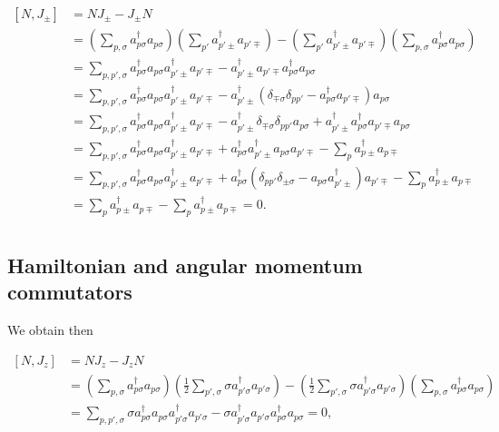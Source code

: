 \documentclass[11pt]{article}
\begin{document}
    \[
\begin{align*}
[N,J_\pm] &= N J_\pm - J_\pm N \\
&= \left( \sum_{p,\sigma} a_{p\sigma}^\dagger a_{p\sigma} \right)
\left( \sum_{p'} a_{p'\pm}^\dagger a_{p'\mp} \right) -
\left( \sum_{p'} a_{p'\pm}^\dagger a_{p'\mp} \right)
\left( \sum_{p,\sigma} a_{p\sigma}^\dagger a_{p\sigma} \right) \\
&= \sum_{p,p',\sigma}
a_{p\sigma}^\dagger a_{p\sigma} a_{p'\pm}^\dagger a_{p'\mp} -
a_{p'\pm}^\dagger a_{p'\mp} a_{p\sigma}^\dagger a_{p\sigma} \\
&= \sum_{p,p',\sigma}
a_{p\sigma}^\dagger a_{p\sigma} a_{p'\pm}^\dagger a_{p'\mp} -
a_{p'\pm}^\dagger \left( \delta_{\mp \sigma} \delta_{pp'} - a_{p\sigma}^\dagger a_{p'\mp} \right) a_{p\sigma} \\
&= \sum_{p,p',\sigma}
a_{p\sigma}^\dagger a_{p\sigma} a_{p'\pm}^\dagger a_{p'\mp} -
a_{p'\pm}^\dagger \delta_{\mp \sigma} \delta_{pp'} a_{p\sigma} +
a_{p'\pm}^\dagger a_{p\sigma}^\dagger a_{p'\mp} a_{p\sigma} \\
&= \sum_{p,p',\sigma}
a_{p\sigma}^\dagger a_{p\sigma} a_{p'\pm}^\dagger a_{p'\mp} +
a_{p\sigma}^\dagger a_{p'\pm}^\dagger a_{p\sigma} a_{p'\mp} -
\sum_{p} a_{p\pm}^\dagger  a_{p\mp} \\
&= \sum_{p,p',\sigma}
a_{p\sigma}^\dagger a_{p\sigma} a_{p'\pm}^\dagger a_{p'\mp} +
a_{p\sigma}^\dagger \left( \delta_{pp'} \delta_{\pm \sigma} -
a_{p\sigma} a_{p'\pm}^\dagger \right) a_{p'\mp} -
\sum_{p} a_{p\pm}^\dagger  a_{p\mp} \\
&= \sum_p a_{p\pm}^\dagger a_{p\mp} -
\sum_{p} a_{p\pm}^\dagger  a_{p\mp} = 0. \\
\end{align*}
\]

    \hypertarget{hamiltonian-and-angular-momentum-commutators}{%
\subsection{Hamiltonian and angular momentum
commutators}\label{hamiltonian-and-angular-momentum-commutators}}

We obtain then

    \[
\begin{align*}
[N,J_z] &= N J_z - J_z N \\
&= \left( \sum_{p,\sigma} a_{p\sigma}^\dagger a_{p\sigma} \right)
\left( \frac{1}{2}\sum_{p',\sigma} \sigma a_{p'\sigma}^\dagger a_{p'\sigma} \right) -
\left( \frac{1}{2}\sum_{p',\sigma} \sigma a_{p'\sigma}^\dagger a_{p'\sigma} \right)
\left( \sum_{p,\sigma} a_{p\sigma}^\dagger a_{p\sigma} \right) \\
&= \sum_{p,p',\sigma} 
\sigma a_{p\sigma}^\dagger a_{p\sigma} a_{p'\sigma}^\dagger a_{p'\sigma} -
\sigma a_{p'\sigma}^\dagger a_{p'\sigma} a_{p\sigma}^\dagger a_{p\sigma} = 0,
\end{align*}
\]
\end{document}
